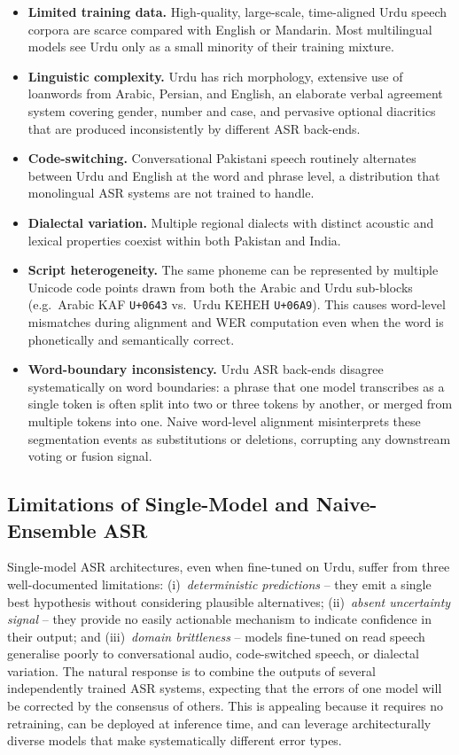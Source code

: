 \begin{itemize}
  \item \textbf{Limited training data.} High-quality, large-scale, time-aligned Urdu speech corpora are scarce compared with English or Mandarin. Most multilingual models see Urdu only as a small minority of their training mixture.
  \item \textbf{Linguistic complexity.} Urdu has rich morphology, extensive use of loanwords from Arabic, Persian, and English, an elaborate verbal agreement system covering gender, number and case, and pervasive optional diacritics that are produced inconsistently by different ASR back-ends.
  \item \textbf{Code-switching.} Conversational Pakistani speech routinely alternates between Urdu and English at the word and phrase level, a distribution that monolingual ASR systems are not trained to handle.
  \item \textbf{Dialectal variation.} Multiple regional dialects with distinct acoustic and lexical properties coexist within both Pakistan and India.
  \item \textbf{Script heterogeneity.} The same phoneme can be represented by multiple Unicode code points drawn from both the Arabic and Urdu sub-blocks (e.g.\ Arabic KAF \texttt{U+0643} vs.\ Urdu KEHEH \texttt{U+06A9}). This causes word-level mismatches during alignment and WER computation even when the word is phonetically and semantically correct.
  \item \textbf{Word-boundary inconsistency.} Urdu ASR back-ends disagree systematically on word boundaries: a phrase that one model transcribes as a single token is often split into two or three tokens by another, or merged from multiple tokens into one. Naive word-level alignment misinterprets these segmentation events as substitutions or deletions, corrupting any downstream voting or fusion signal.
\end{itemize}

\subsection{Limitations of Single-Model and Naive-Ensemble ASR}
\label{ssec:single-model-limits}

Single-model ASR architectures, even when fine-tuned on Urdu, suffer from three well-documented limitations: (i)~\emph{deterministic predictions} -- they emit a single best hypothesis without considering plausible alternatives; (ii)~\emph{absent uncertainty signal} -- they provide no easily actionable mechanism to indicate confidence in their output; and (iii)~\emph{domain brittleness} -- models fine-tuned on read speech generalise poorly to conversational audio, code-switched speech, or dialectal variation. The natural response is to combine the outputs of several independently trained ASR systems, expecting that the errors of one model will be corrected by the consensus of others. This is appealing because it requires no retraining, can be deployed at inference time, and can leverage architecturally diverse models that make systematically different error types.

